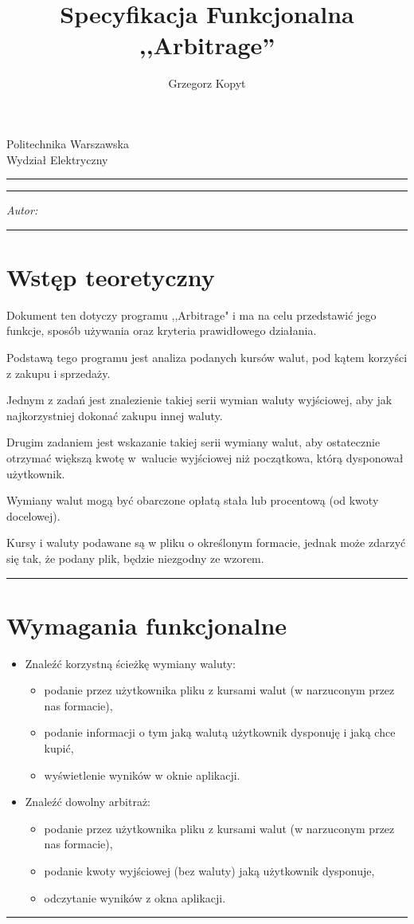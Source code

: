 \documentclass[a4paper,11pt]{article}
\author{Grzegorz Kopyt}
\title{Specyfikacja Funkcjonalna \\
,,Arbitrage''}
\makeatletter
\newcommand{\linia}{\rule{\linewidth}{0.4mm}}
\renewcommand{\maketitle}{\begin{titlepage}
    \vspace*{2cm}
    \begin{center}\LARGE
    Politechnika Warszawska\\
    Wydział Elektryczny\\
    \end{center}
    \vspace{5cm}
    \noindent\linia
    \begin{center}
      \LARGE \textsc{\@title}
         \end{center}
     \linia
    \vspace{0.5cm}
    \begin{flushright}
    \begin{minipage}{5cm}
    \textit{Autor:}\\
    \normalsize \textsc{\@author} \par
    \end{minipage}
    \vspace{5cm}
     \end{flushright}
    \vspace*{\stretch{6}}
    \begin{center}
    \@date
    \end{center}
  \end{titlepage}
}
\makeatother
\begin{document}
\maketitle

\tableofcontents
\vspace{1cm}
\noindent\linia
\section{Wstęp teoretyczny}

\qquad Dokument ten dotyczy programu ,,Arbitrage" i ma na celu przedstawić jego funkcje, sposób używania oraz kryteria prawidłowego działania.

Podstawą tego programu jest analiza podanych kursów walut, pod kątem korzyści z zakupu i sprzedaży.

Jednym z zadań jest znalezienie takiej serii wymian waluty wyjściowej, aby jak najkorzystniej dokonać zakupu innej waluty.

Drugim zadaniem jest wskazanie takiej serii wymiany walut, aby ostatecznie otrzymać większą kwotę w~walucie wyjściowej niż początkowa, którą dysponował użytkownik.

Wymiany walut mogą być obarczone opłatą stała lub procentową (od kwoty docelowej).

Kursy i waluty podawane są w pliku o określonym formacie, jednak może zdarzyć się tak, że podany plik, będzie niezgodny ze wzorem.

\noindent\linia
\section{Wymagania funkcjonalne}
\begin{itemize}
\item Znaleźć korzystną ścieżkę wymiany waluty:
\begin{itemize}
\item podanie przez użytkownika pliku z kursami walut (w narzuconym przez nas formacie),
\item podanie informacji o tym jaką walutą użytkownik dysponuję  i jaką chce kupić,
\item wyświetlenie wyników w oknie aplikacji.
\end{itemize}
\item Znaleźć dowolny arbitraż:
\begin{itemize}
\item podanie przez użytkownika pliku z kursami walut (w narzuconym przez nas formacie),
\item podanie kwoty wyjściowej (bez waluty) jaką użytkownik dysponuje,
\item odczytanie wyników z okna aplikacji.
\end{itemize}
\end{itemize}
\noindent\linia
\newpage
\end{document}
